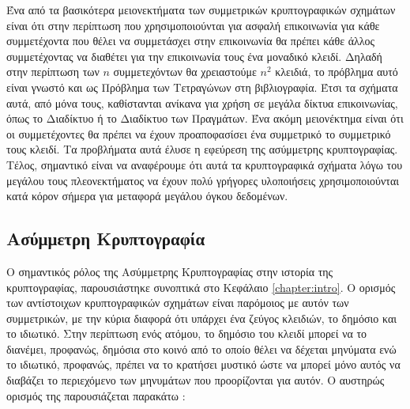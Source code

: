 Ένα από τα βασικότερα μειονεκτήματα των συμμετρικών κρυπτογραφικών σχημάτων είναι ότι στην περίπτωση που χρησιμοποιούνται για ασφαλή επικοινωνία για κάθε συμμετέχοντα που θέλει να συμμετάσχει στην επικοινωνία θα πρέπει κάθε άλλος συμμετέχοντας να διαθέτει για την επικοινωνία τους ένα μοναδικό κλειδί. Δηλαδή στην περίπτωση των $n$ συμμετεχόντων θα χρειαστούμε $n^2$ κλειδιά, το πρόβλημα αυτό είναι γνωστό και ως Πρόβλημα των Τετραγώνων στη βιβλιογραφία. Έτσι τα σχήματα αυτά, από μόνα τους, καθίστανται ανίκανα για χρήση σε μεγάλα δίκτυα επικοινωνίας, όπως το Διαδίκτυο ή το Διαδίκτυο των Πραγμάτων. Ένα ακόμη μειονέκτημα είναι ότι οι συμμετέχοντες θα πρέπει να έχουν προαποφασίσει ένα συμμετρικό το συμμετρικό τους κλειδί. Τα προβλήματα αυτά έλυσε η εφεύρεση της ασύμμετρης κρυπτογραφίας. Τέλος, σημαντικό είναι να αναφέρουμε ότι αυτά τα κρυπτογραφικά σχήματα λόγω του μεγάλου τους πλεονεκτήματος να έχουν πολύ γρήγορες υλοποιήσεις χρησιμοποιούνται κατά κόρον σήμερα για μεταφορά μεγάλου όγκου δεδομένων.

\subsection{Ασύμμετρη Κρυπτογραφία}

Ο σημαντικός ρόλος της Ασύμμετρης Κρυπτογραφίας στην ιστορία της κρυπτογραφίας, παρουσιάστηκε συνοπτικά στο Κεφάλαιο \ref{chapter:intro}. Ο ορισμός των αντίστοιχων κρυπτογραφικών σχημάτων είναι παρόμοιος με αυτόν των συμμετρικών, με την κύρια διαφορά ότι υπάρχει ένα ζεύγος κλειδιών, το δημόσιο και το ιδιωτικό. Στην περίπτωση ενός ατόμου, το δημόσιο του κλειδί μπορεί να το διανέμει, προφανώς, δημόσια στο κοινό από το οποίο θέλει να δέχεται μηνύματα ενώ το ιδιωτικό, προφανώς, πρέπει να το κρατήσει μυστικό ώστε να μπορεί μόνο αυτός να διαβάζει το περιεχόμενο των μηνυμάτων που προορίζονται για αυτόν. Ο αυστηρώς ορισμός της παρουσιάζεται παρακάτω :

